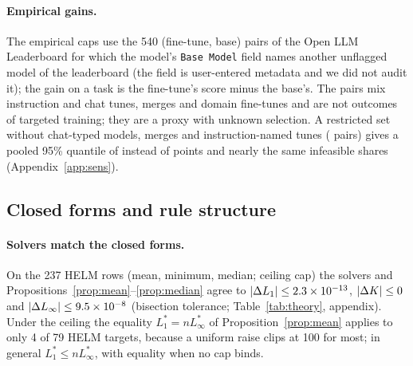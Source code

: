 \paragraph{Empirical gains.}
The empirical caps use the 540 (fine-tune, base) pairs of the Open LLM Leaderboard for which the model's \texttt{Base Model} field names another unflagged model of the leaderboard (the field is user-entered metadata and we did not audit it); the gain on a task is the fine-tune's score minus the base's. The pairs mix instruction and chat tunes, merges and domain fine-tunes and are not outcomes of targeted training; they are a proxy with unknown selection. A restricted set without chat-typed models, merges and instruction-named tunes (\pairRestrictedN{} pairs) gives a pooled 95\% quantile of \empPooledRestricted{} instead of \empPooled{} points and nearly the same infeasible shares (Appendix~\ref{app:sens}).

\subsection{Closed forms and rule structure}
\label{sec:exp-theory}

\paragraph{Solvers match the closed forms.}
On the 237 HELM rows (mean, minimum, median; ceiling cap) the solvers and Propositions~\ref{prop:mean}--\ref{prop:median} agree to $|\Delta L_1|\le2.3\times10^{-13}$, $|\Delta K|\le0$ and $|\Delta L_\infty|\le9.5\times10^{-8}$ (bisection tolerance; Table~\ref{tab:theory}, appendix). Under the ceiling the equality $L_1^\ast=nL_\infty^\ast$ of Proposition~\ref{prop:mean} applies to only 4 of 79 HELM targets, because a uniform raise clips at 100 for most; in general $L_1^\ast\le nL_\infty^\ast$, with equality when no cap binds.

